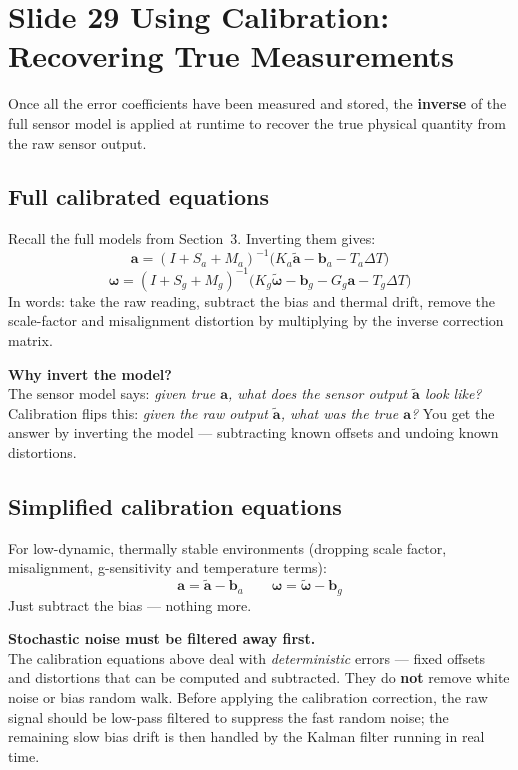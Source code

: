 \documentclass[12pt, a4paper]{article}
\begin{document}

\section*{Slide 29 \quad Using Calibration: Recovering True Measurements}

Once all the error coefficients have been measured and stored, the
\textbf{inverse} of the full sensor model is applied at runtime to
recover the true physical quantity from the raw sensor output.

\subsection*{Full calibrated equations}

Recall the full models from Section~3.
Inverting them gives:
\[
  \mathbf{a} = (I + S_a + M_a)^{-1}
    \bigl(K_a\tilde{\mathbf{a}} - \mathbf{b}_a - T_a\Delta T\bigr)
\]
\[
  \boldsymbol{\omega} = (I + S_g + M_g)^{-1}
    \bigl(K_g\tilde{\boldsymbol{\omega}} - \mathbf{b}_g
          - G_g\mathbf{a} - T_g\Delta T\bigr)
\]
In words: take the raw reading, subtract the bias and thermal drift,
remove the scale-factor and misalignment distortion by multiplying
by the inverse correction matrix.

\begin{notebox}
  \textbf{Why invert the model?}\\
  The sensor model says: \emph{given true $\mathbf{a}$, what does the
  sensor output $\tilde{\mathbf{a}}$ look like?}
  Calibration flips this: \emph{given the raw output
  $\tilde{\mathbf{a}}$, what was the true $\mathbf{a}$?}
  You get the answer by inverting the model --- subtracting known
  offsets and undoing known distortions.
\end{notebox}

\subsection*{Simplified calibration equations}

For low-dynamic, thermally stable environments (dropping scale factor,
misalignment, g-sensitivity and temperature terms):
\[
  \mathbf{a} = \tilde{\mathbf{a}} - \mathbf{b}_a
  \qquad
  \boldsymbol{\omega} = \tilde{\boldsymbol{\omega}} - \mathbf{b}_g
\]
Just subtract the bias --- nothing more.

\begin{warnbox}
  \textbf{Stochastic noise must be filtered away first.}\\
  The calibration equations above deal with \emph{deterministic}
  errors --- fixed offsets and distortions that can be computed and
  subtracted.
  They do \textbf{not} remove white noise or bias random walk.
  Before applying the calibration correction, the raw signal should
  be low-pass filtered to suppress the fast random noise; the
  remaining slow bias drift is then handled by the Kalman filter
  running in real time.
\end{warnbox}
\end{document}
